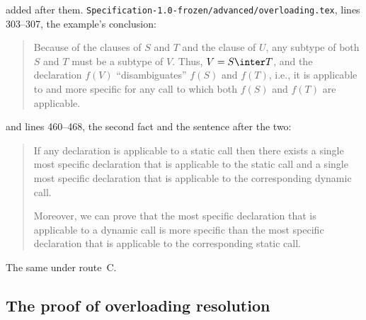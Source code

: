 \begin{description}
added after them.
\nolinkurl{Specification-1.0-frozen/advanced/overloading.tex}, lines 303--307,
the example's conclusion:
\begin{quote}
Because of the  clauses of $S$ and $T$ and the 
clause of $U$, any subtype of both $S$ and $T$ must be a subtype of $V$.  Thus,
$V = S \inter T$, and the declaration $f(V)$ ``disambiguates'' $f(S)$ and
$f(T)$, i.e., it is applicable to and more specific for any call to which both
$f(S)$ and $f(T)$ are applicable.
\end{quote}
and lines 460--468, the second fact and the sentence after the two:
\begin{quote}
If any declaration is applicable to a static call then there exists a single
most specific declaration that is applicable to the static call and a single
most specific declaration that is applicable to the corresponding dynamic call.

Moreover, we can prove that the most specific declaration that is applicable to
a dynamic call is more specific than the most specific declaration that is
applicable to the corresponding static call.
\end{quote}
\item[Route C] The same under route~C.
\end{description}

\subsection{The proof of overloading resolution}

